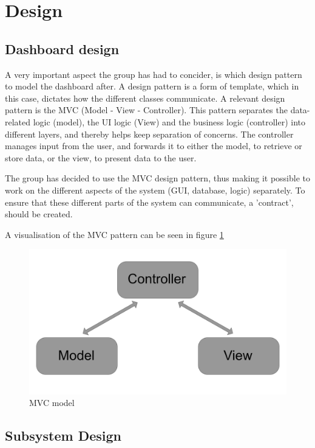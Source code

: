\section{Design}

\subsection{Dashboard design}
A very important aspect the group has had to concider, is which design pattern
to model the dashboard after. A design pattern is a form of template, which in
this case, dictates how the different classes communicate. A relevant design
pattern is the MVC (Model - View - Controller). This pattern separates the
data-related logic (model), the UI logic (View) and the business logic 
(controller) into different layers, and thereby helps keep separation of
concerns. The controller manages input from the user, and forwards it to either
the model, to retrieve or store data, or the view, to present data to the user.

The group has decided to use the MVC design pattern, thus making it possible to
work on the different aspects of the system (GUI, database, logic) separately.
To ensure that these different parts of the system can communicate, a
'contract', should be created.

A visualisation of the MVC pattern can be seen in figure \ref{figure:MVC_model}

\begin{figure}[ht]
    \centering
    \includegraphics[scale=0.15]{images/MVC_model.png}
    \caption{MVC model}
    \label{figure:MVC_model}
\end{figure}

\subsection{Subsystem Design}
